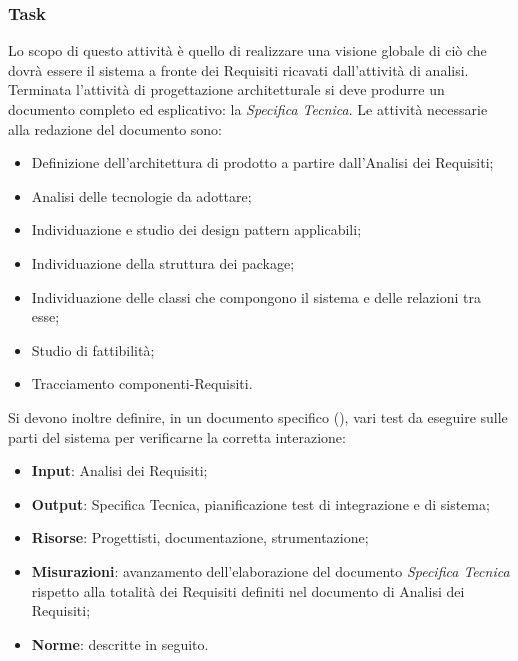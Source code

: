 \subsubsection{Task}
Lo scopo di questo attività è quello di realizzare una visione globale di ciò che dovrà essere il sistema a fronte dei Requisiti ricavati dall’attività di analisi.
Terminata l’attività di progettazione architetturale si deve produrre un documento completo ed esplicativo: la \emph{Specifica Tecnica}.
Le attività necessarie alla redazione del documento sono:
\begin{itemize}
\item Definizione dell’architettura di prodotto a partire dall’Analisi dei Requisiti;
\item Analisi delle tecnologie da adottare;
\item Individuazione e studio dei design pattern applicabili;
\item Individuazione della struttura dei package;
\item Individuazione delle classi che compongono il sistema e delle relazioni tra esse;
\item Studio di fattibilità;
\item Tracciamento componenti-Requisiti.
\end{itemize}
Si devono inoltre definire, in un documento specifico  (\href{run:../../Esterni/\fPianoDiQualifica}{\fEscapePianoDiQualifica}), vari
test da eseguire sulle parti del sistema per verificarne la corretta interazione:
\begin{itemize}
\item \textbf{Input}: Analisi dei Requisiti;
\item \textbf{Output}: Specifica Tecnica, pianificazione test di integrazione e di sistema;
\item \textbf{Risorse}: Progettisti, documentazione, strumentazione;
\item \textbf{Misurazioni}: avanzamento dell'elaborazione del documento \emph{Specifica Tecnica} rispetto alla totalità dei Requisiti definiti nel documento di Analisi dei Requisiti;
\item \textbf{Norme}: descritte in seguito.
\end{itemize}
       
